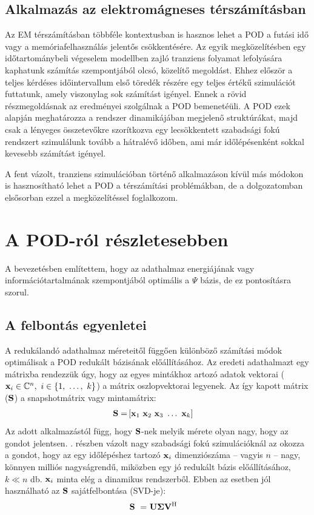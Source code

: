         \subsection{Alkalmazás az elektromágneses térszámításban}
            \label{sec:empod}
            Az EM térszámításban többféle kontextusban is hasznos lehet a POD a futási idő  vagy a memóriafelhasználás jelentős csökkentésére. Az egyik megközelítésben egy időtartománybeli végeselem modellben zajló tranziens folyamat lefolyására kaphatunk számítás szempontjából olcsó, közelítő megoldást. Ehhez először a teljes kérdéses időintervallum első töredék részére egy teljes értékű szimulációt futtatunk, amely viszonylag sok számítást igényel. Ennek a rövid részmegoldásnak az eredményei szolgálnak a POD bemenetéüli. A POD ezek alapján meghatározza a rendszer dinamikájában megjelenő struktúrákat, majd csak a lényeges összetevőkre szorítkozva egy lecsökkentett szabadsági fokú rendszert szimulálunk tovább a hátralévő időben, ami már időlépésenként sokkal kevesebb számítást igényel.
            \par
            A fent vázolt, tranziens szimulációban történő alkalmazáson kívül más módokon is hasznosítható lehet a POD a térszámítási problémákban, de a dolgozatomban elsősorban ezzel a megközelítéssel foglalkozom.
    \section{A POD-ról részletesebben}
        A bevezetésben említettem, hogy az adathalmaz energiájának vagy információtartalmának szempontjából optimális a $\Psi$ bázis, de ez pontosításra szorul.
        \subsection{A felbontás egyenletei}
            A redukálandó adathalmaz méreteitől függően különböző számítási módok optimálisak a POD redukált bázisának előállításához. Az eredeti adathalmazt egy mátrixba rendezzük úgy, hogy az egyes mintákhoz artozó adatok vektorai (${\bf x}_i \in \mathbb{C}^n,~i \in \{1,~\hdots,~k\}$) a mátrix oszlopvektorai legyenek. Az így kapott mátrix (${\bf S}$) a snapshotmátrix vagy mintamátrix:
            \begin{align}
                {\bf S} = & \left[ {\bf x}_1~{\bf x}_2~{\bf x}_3~\hdots~{\bf x}_k \right]
            \end{align}
            Az adott alkalmazástól függ, hogy ${\bf S}$-nek melyik mérete olyan nagy, hogy az gondot jelentsen. . részben vázolt nagy szabadsági fokú szimulációknál az okozza a gondot, hogy az egy időlépéshez tartozó ${\bf x}_i$ dimenziószáma -- vagyis $n$ -- nagy, könnyen milliós nagyságrendű, miközben egy jó redukált bázis előállításához, $k \ll n$ db. ${\bf x}_i$ minta elég a dinamikus rendszerből. Ebben az esetben jól használható az ${\bf S}$ sajátfelbontása (SVD-je):
            \begin{align}
                \label{equ:svd}
                {\bf S}~=&~{\bf U \Sigma V^{\mathrm{H}}}
            \end{align}
